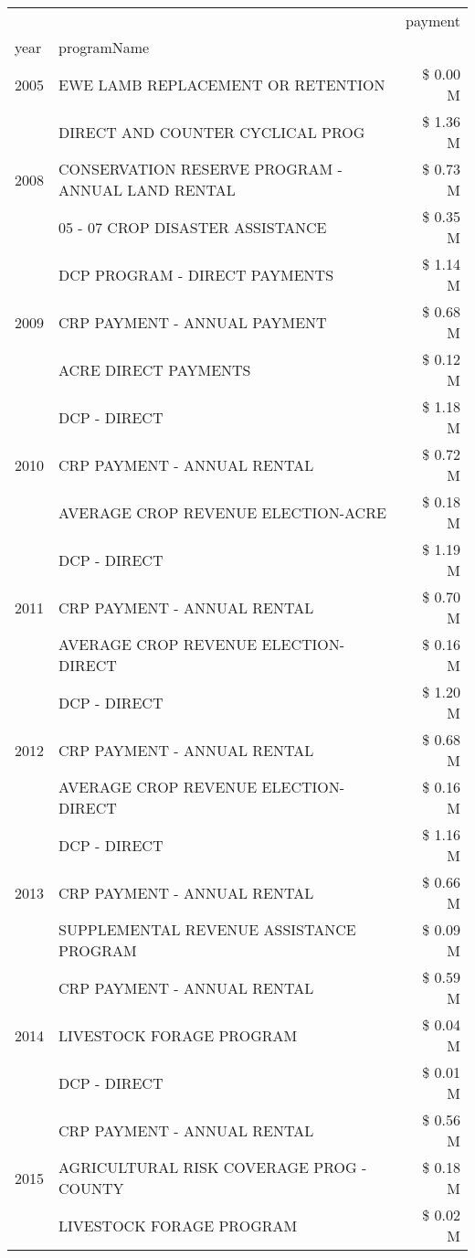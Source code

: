 \begin{tabular}{llr}
\toprule
 &  & payment \\
year & programName &  \\
\midrule
2005 & EWE LAMB REPLACEMENT OR RETENTION & \$ 0.00 M \\
\cline{1-3}
\multirow[t]{3}{*}{2008} & DIRECT AND COUNTER CYCLICAL PROG & \$ 1.36 M \\
 & CONSERVATION RESERVE PROGRAM - ANNUAL LAND RENTAL & \$ 0.73 M \\
 & 05 - 07 CROP DISASTER ASSISTANCE & \$ 0.35 M \\
\cline{1-3}
\multirow[t]{3}{*}{2009} & DCP PROGRAM - DIRECT PAYMENTS & \$ 1.14 M \\
 & CRP PAYMENT - ANNUAL PAYMENT & \$ 0.68 M \\
 & ACRE DIRECT PAYMENTS & \$ 0.12 M \\
\cline{1-3}
\multirow[t]{3}{*}{2010} & DCP - DIRECT & \$ 1.18 M \\
 & CRP PAYMENT - ANNUAL RENTAL & \$ 0.72 M \\
 & AVERAGE CROP REVENUE ELECTION-ACRE & \$ 0.18 M \\
\cline{1-3}
\multirow[t]{3}{*}{2011} & DCP - DIRECT & \$ 1.19 M \\
 & CRP PAYMENT - ANNUAL RENTAL & \$ 0.70 M \\
 & AVERAGE CROP REVENUE ELECTION-DIRECT & \$ 0.16 M \\
\cline{1-3}
\multirow[t]{3}{*}{2012} & DCP - DIRECT & \$ 1.20 M \\
 & CRP PAYMENT - ANNUAL RENTAL & \$ 0.68 M \\
 & AVERAGE CROP REVENUE ELECTION-DIRECT & \$ 0.16 M \\
\cline{1-3}
\multirow[t]{3}{*}{2013} & DCP - DIRECT & \$ 1.16 M \\
 & CRP PAYMENT - ANNUAL RENTAL & \$ 0.66 M \\
 & SUPPLEMENTAL REVENUE ASSISTANCE PROGRAM & \$ 0.09 M \\
\cline{1-3}
\multirow[t]{3}{*}{2014} & CRP PAYMENT - ANNUAL RENTAL & \$ 0.59 M \\
 & LIVESTOCK FORAGE PROGRAM & \$ 0.04 M \\
 & DCP - DIRECT & \$ 0.01 M \\
\cline{1-3}
\multirow[t]{3}{*}{2015} & CRP PAYMENT - ANNUAL RENTAL & \$ 0.56 M \\
 & AGRICULTURAL RISK COVERAGE PROG - COUNTY & \$ 0.18 M \\
 & LIVESTOCK FORAGE PROGRAM & \$ 0.02 M \\

\end{tabular}
